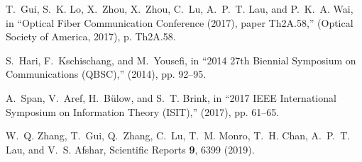 \documentclass[9pt,twocolumn,twoside]{osajnl}
\begin{document}
\begin{thebibliography}{10}
T.~Gui, S.~K. Lo, X.~Zhou, X.~Zhou, C.~Lu, A.~P.~T. Lau, and P.~K.~A. Wai, in \enquote{Optical {Fiber} {Communication} {Conference} (2017), paper {Th}2A.58,}  (Optical Society of America, 2017), p. Th2A.58.

S.~Hari, F.~Kschischang, and M.~Yousefi, in \enquote{2014 27th {Biennial} {Symposium} on {Communications} ({QBSC}),}  (2014), pp. 92--95.

A.~Span, V.~Aref, H.~Bülow, and S.~T. Brink, in \enquote{2017 {IEEE} {International} {Symposium} on {Information} {Theory} ({ISIT}),}  (2017), pp. 61--65.

W.~Q. Zhang, T.~Gui, Q.~Zhang, C.~Lu, T.~M. Monro, T.~H. Chan, A.~P.~T. Lau, and V.~S. Afshar, Scientific Reports \textbf{9}, 6399 (2019).

\end{thebibliography}



\end{document}
